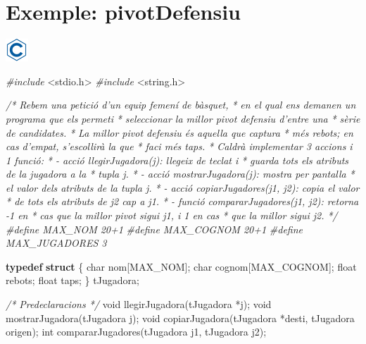 \documentclass[]{book}
\newenvironment{Shaded}{\begin{snugshade}}{\end{snugshade}}
\newcommand{\KeywordTok}[1]{\textcolor[rgb]{0.13,0.29,0.53}{\textbf{#1}}}
\newcommand{\DataTypeTok}[1]{\textcolor[rgb]{0.13,0.29,0.53}{#1}}
\newcommand{\ImportTok}[1]{#1}
\newcommand{\CommentTok}[1]{\textcolor[rgb]{0.56,0.35,0.01}{\textit{#1}}}
\newcommand{\PreprocessorTok}[1]{\textcolor[rgb]{0.56,0.35,0.01}{\textit{#1}}}
\newcommand{\NormalTok}[1]{#1}
\begin{document}
\section{Exemple: pivotDefensiu}\label{exemple-pivotdefensiu}

\includegraphics{./img/c.png}

\begin{Shaded}
\begin{Highlighting}[]
\PreprocessorTok{#include }\ImportTok{<stdio.h>}
\PreprocessorTok{#include }\ImportTok{<string.h>}

\CommentTok{/* Rebem una petició d'un equip femení de bàsquet,}
\CommentTok{ * en el qual ens demanen un programa que els permeti}
\CommentTok{ * seleccionar la millor pivot defensiu d'entre una }
\CommentTok{ * sèrie de candidates.}
\CommentTok{ * La millor pivot defensiu és aquella que captura}
\CommentTok{ * més rebots; en cas d'empat, s'escollirà la que}
\CommentTok{ * faci més taps.}
\CommentTok{ * Caldrà implementar 3 accions i 1 funció:}
\CommentTok{ * - acció llegirJugadora(j): llegeix de teclat i}
\CommentTok{ * guarda tots els atributs de la jugadora a la}
\CommentTok{ * tupla j.}
\CommentTok{ * - acció mostrarJugadora(j): mostra per pantalla}
\CommentTok{ * el valor dels atributs de la tupla j.}
\CommentTok{ * - acció copiarJugadores(j1, j2): copia el valor}
\CommentTok{ * de tots els atributs de j2 cap a j1.}
\CommentTok{ * - funció compararJugadores(j1, j2): retorna -1 en }
\CommentTok{ * cas que la millor pivot sigui j1, i 1 en cas }
\CommentTok{ * que la millor sigui j2.}
\CommentTok{ */}
\PreprocessorTok{#define MAX_NOM 20+1}
\PreprocessorTok{#define MAX_COGNOM 20+1}
\PreprocessorTok{#define MAX_JUGADORES 3}

\KeywordTok{typedef} \KeywordTok{struct}\NormalTok{ \{}
    \DataTypeTok{char}\NormalTok{ nom[MAX_NOM];}
    \DataTypeTok{char}\NormalTok{ cognom[MAX_COGNOM];}
    \DataTypeTok{float}\NormalTok{ rebots;}
    \DataTypeTok{float}\NormalTok{ taps;}
\NormalTok{\} tJugadora;}

\CommentTok{/* Predeclaracions */}
\DataTypeTok{void}\NormalTok{ llegirJugadora(tJugadora *j);}
\DataTypeTok{void}\NormalTok{ mostrarJugadora(tJugadora j);}
\DataTypeTok{void}\NormalTok{ copiarJugadora(tJugadora *desti, tJugadora origen);}
\DataTypeTok{int}\NormalTok{ compararJugadores(tJugadora j1, tJugadora j2);}


\end{Highlighting}
\end{Shaded}
\end{document}
